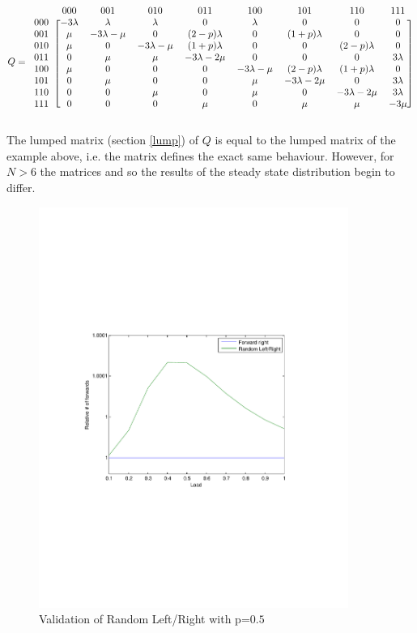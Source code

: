 \documentclass[10pt,a4paper]{article}
\begin{document}
\[ Q =
  \begin{blockarray}{ccccccccc}
    & 000 & 001 & 010 & 011 & 100 & 101 & 110 & 111 \\
    \begin{block}{c[cccccccc]}
    000 & -3 \lambda & \lambda & \lambda & 0 & \lambda & 0 & 0 & 0 \\
    001 & \mu & -3\lambda-\mu & 0 & (2-p)\lambda & 0 & (1+p)\lambda & 0 & 0 \\
    010 & \mu & 0 & -3\lambda-\mu & (1+p)\lambda & 0 & 0 & (2-p)\lambda & 0 \\
    011 & 0 & \mu & \mu & -3\lambda-2\mu & 0 & 0 & 0 & 3\lambda \\
    100 & \mu & 0 & 0 & 0 & -3\lambda-\mu & (2-p)\lambda & (1+p)\lambda & 0 \\
    101 & 0 & \mu & 0 & 0 & \mu & -3\lambda-2\mu & 0 & 3\lambda \\
    110 & 0 & 0 & \mu & 0 & \mu & 0 & -3\lambda-2\mu & 3\lambda \\
    111 & 0 & 0 & 0 & \mu & 0 & \mu & \mu & -3\mu \\
    \end{block}
  \end{blockarray}
\]

The lumped matrix (section \ref{lump}) of $Q$ is equal to the lumped matrix of the example above, i.e. the matrix defines the exact same behaviour. However, for $N > 6$ the matrices and so the results of the steady state distribution begin to differ.

\begin{figure}[h!tb]
\centering
\includegraphics[clip=true, trim=9em 24em 9em 24em, width=0.9\textwidth]{resources/plotrandlr.pdf}
\caption{Validation of Random Left/Right with p=$0.5$}
\label{validrlr}
\end{figure}
\end{document}
